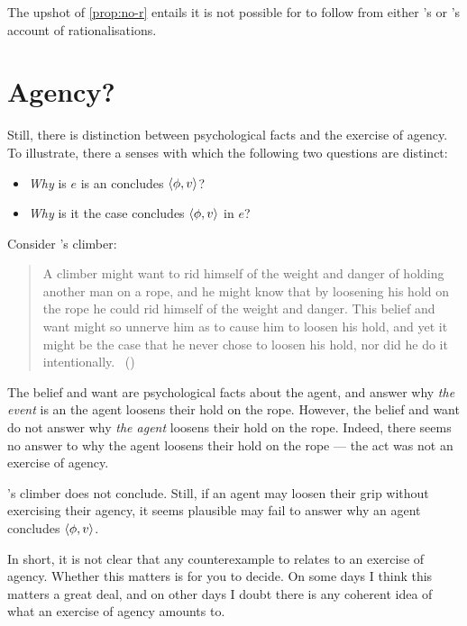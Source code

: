 \begin{note}
  The upshot of \autoref{prop:no-r} entails it is not possible for \issueInclusion{} to follow from either \citeauthor{Davidson:1963aa}'s or \citeauthor{Hieronymi:2011aa}'s account of rationalisations.
\end{note}


\section{Agency?}
\label{sec:agency}

\begin{note}
  Still, there is distinction between psychological facts and the exercise of agency.
  To illustrate, there a senses with which the following two questions are distinct:

  \begin{itemize}
  \item
    \emph{Why} is \(e\) is an  \vAgent{} concludes \(\langle\phi, v\rangle\)?
  \item
    \emph{Why} is it the case \vAgent{} concludes \(\langle\phi, v\rangle\) in \(e\)?
  \end{itemize}
  Consider \citeauthor{Davidson:1973vd}'s climber:
  \begin{quote}
    A climber might want to rid himself of the weight and danger of holding another man on a rope, and he might know that by loosening his hold on the rope he could rid himself of the weight and danger.
    This belief and want might so unnerve him as to cause him to loosen his hold, and yet it might be the case that he never chose to loosen his hold, nor did he do it intentionally.%
    \mbox{ }\hfill\mbox{(\citeyear[79]{Davidson:1973vd})}
  \end{quote}
  The \agents{} belief and want are psychological facts about the agent, and answer why \emph{the event} is an  the agent loosens their hold on the rope.
  However, the \agents{} belief and want do not answer why \emph{the agent} loosens their hold on the rope.
  Indeed, there seems no answer to why the agent loosens their hold on the rope --- the act was not an exercise of agency.

  \citeauthor{Davidson:1973vd}'s climber does not conclude.
  Still, if an agent may loosen their grip without exercising their agency, it seems plausible  may fail to answer why  an agent concludes \(\langle\phi, v\rangle\).

  In short, it is not clear that any counterexample to \issueInclusion{} relates to an exercise of agency.
  Whether this matters is for you to decide.
  On some days I think this matters a great deal, and on other days I doubt there is any coherent idea of what an exercise of agency amounts to.
\end{note}


